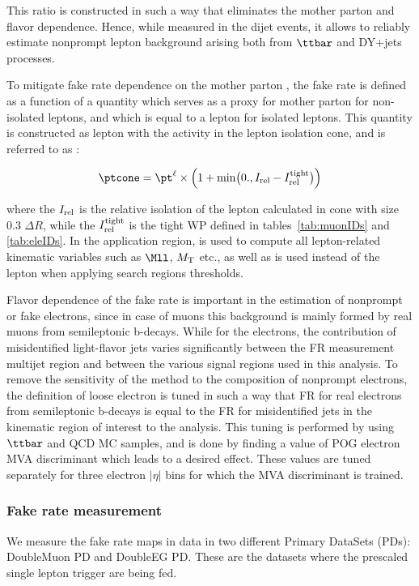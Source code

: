 This ratio is constructed in such a way that eliminates the mother parton \pt and flavor dependence.
Hence, while measured in the dijet events, it allows to reliably estimate nonprompt lepton background
arising both from $\ttbar$ and DY+jets processes. 

To mitigate fake rate dependence on the mother parton \pt, the fake rate is defined as a function
of a quantity which serves as a proxy for mother parton \pt for non-isolated leptons, and which
is equal to a lepton \pt for isolated leptons. This quantity is constructed as lepton \pt with 
the activity in the lepton isolation cone, and is referred to as \ptcone:

\begin{equation}
\ptcone = \pt^\ell\times\Bigl(1+ \min\bigl(0., \Irel - \Irel^\text{tight}\bigr) \Bigr)
\end{equation}

where the $I_{\mathrm{rel}}$ is the relative isolation of the lepton calculated in cone with size 0.3 $\Delta R$, while the $I_{\mathrm{rel}}^\text{tight}$ is the tight WP defined in tables~\ref{tab:muonIDs} and \ref{tab:eleIDs}.
In the application region, \ptcone is used to compute all lepton-related kinematic variables
such as $\Mll$, $M_{\mathrm{T}}$ etc., as well as is used instead of the lepton \pt when applying 
search regions \pt thresholds.

Flavor dependence of the fake rate is important in the estimation of nonprompt or fake electrons, 
since in case of muons this background is mainly formed by real muons from semileptonic b-decays.
While for the electrons, the contribution of misidentified light-flavor jets varies significantly between 
the FR measurement multijet region and between the various signal regions used in this analysis. 
To remove the sensitivity of the method to the composition of nonprompt electrons, the definition
of loose electron is tuned in such a way that FR for real electrons from semileptonic b-decays
is equal to the FR for misidentified jets in the kinematic region of interest to the analysis. 
This tuning is performed by using $\ttbar$ and QCD MC samples, and is done by finding a value of 
POG electron MVA discriminant which leads to a desired effect. These values are tuned separately 
for three electron $|\eta|$ bins for which the MVA discriminant is
trained. 

\subsubsection{Fake rate measurement}
We measure the fake rate maps in data in two different Primary DataSets (PDs): DoubleMuon PD and DoubleEG PD.
These are the datasets where the prescaled single lepton trigger are being fed.

